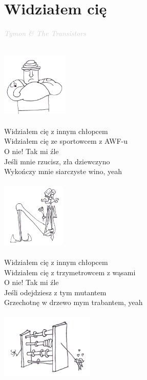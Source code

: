 \documentclass[a5paper, 10pt]{book}
\begin{document}
\section{Widziałem cię}\textcolor{lightgray}{\textit{Tymon \& The Transistors
  }}\\
\begin{minipage}[t]{0.9\textwidth}
  ~\\
  \includegraphics[height=3cm, right]{widzialem_cie_1.png}\vspace*{-3.1cm}\\
  ~\\
  Widziałem cię z innym chłopcem\\
  Widziałem cię ze sportowcem z AWF-u\\
  O nie! Tak mi źle\\
  Jeśli mnie rzucisz, zła dziewczyno\\
  Wykończy mnie siarczyste wino, yeah\\
  \\
  \includegraphics[height=3cm, right]{widzialem_cie_2.png}\vspace*{-3.1cm}\\
  \\
  Widziałem cię z innym chłopcem\\
  Widziałem cię z trzymetrowcem z wąsami\\
  O nie! Tak mi źle\\
  Jeśli odejdziesz z tym mutantem\\
  Grzechotnę w drzewo mym trabantem, yeah\\
  \\
  \includegraphics[height=3cm, right]{widzialem_cie_3.png}\vspace*{-3.1cm}\\

\end{minipage}
\end{document}
